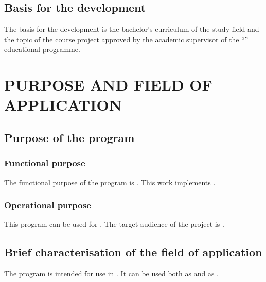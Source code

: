 \documentclass[12pt,a4paper]{extarticle}
\begin{document}
\subsection{Basis for the development}

The basis for the development is the bachelor's curriculum of the study field  and the topic of the course project approved by the academic supervisor of the \enquote{\hseSpecialization} educational programme.

\clearpage

\section{PURPOSE AND FIELD OF APPLICATION}

\subsection{Purpose of the program}

\subsubsection{Functional purpose}

The functional purpose of the program is . This work implements .

\subsubsection{Operational purpose}

This program can be used for . The target audience of the project is .

\subsection{Brief characterisation of the field of application}

The program is intended for use in . It can be used both as  and as .
\end{document}
